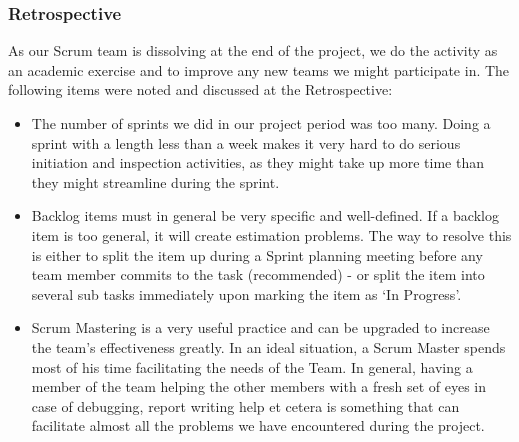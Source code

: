 \subsubsection{Retrospective}
As our Scrum team is dissolving at the end of the project, we do the activity as an academic exercise and to improve any new teams we might participate in. The following items were noted and discussed at the Retrospective:
\begin{itemize}
\item The number of sprints we did in our project period was too many. Doing a sprint with a length less than a week makes it very hard to do serious initiation and inspection activities, as they might take up more time than they might streamline during the sprint.
\item Backlog items must in general be very specific and well-defined. If a backlog item is too general, it will create estimation problems. The way to resolve this is either to split the item up during a Sprint planning meeting before any team member commits to the task (recommended) - or split the item into several sub tasks immediately upon marking the item as `In Progress'.
\item Scrum Mastering is a very useful practice and can be upgraded to increase the team’s effectiveness greatly. In an ideal situation, a Scrum Master spends most of his time facilitating the needs of the Team. In general, having a member of the team helping the other members with a fresh set of eyes in case of debugging, report writing help et cetera is something that can facilitate almost all the problems we have encountered during the project.
\end{itemize}
\newpage